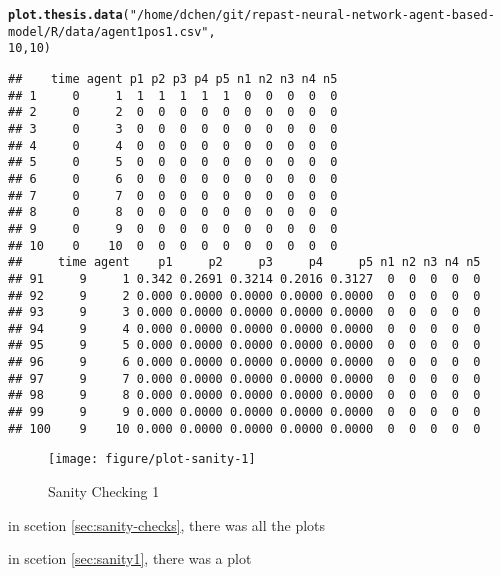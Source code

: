 \documentclass{article}\usepackage[]{graphicx}\usepackage[]{color}
\makeatletter
\def\maxwidth{ %
  \ifdim\Gin@nat@width>\linewidth
    \linewidth
  \else
    \Gin@nat@width
  \fi
}
\newcommand{\hlnum}[1]{\textcolor[rgb]{0.686,0.059,0.569}{#1}}%
\newcommand{\hlstr}[1]{\textcolor[rgb]{0.192,0.494,0.8}{#1}}%
\newcommand{\hlstd}[1]{\textcolor[rgb]{0.345,0.345,0.345}{#1}}%
\newcommand{\hlkwd}[1]{\textcolor[rgb]{0.737,0.353,0.396}{\textbf{#1}}}%
\newenvironment{kframe}{%
 \def\at@end@of@kframe{}%
 \ifinner\ifhmode%
  \def\at@end@of@kframe{\end{minipage}}%
  \begin{minipage}{\columnwidth}%
 \fi\fi%
 \def\FrameCommand##1{\hskip\@totalleftmargin \hskip-\fboxsep
 \colorbox{shadecolor}{##1}\hskip-\fboxsep
     \hskip-\linewidth \hskip-\@totalleftmargin \hskip\columnwidth}%
 \MakeFramed {\advance\hsize-\width
   \@totalleftmargin\z@ \linewidth\hsize
   \@setminipage}}%
 {\par\unskip\endMakeFramed%
 \at@end@of@kframe}
\newenvironment{knitrout}{}{} %
\makeatother
\begin{document}
\begin{knitrout}
\color{fgcolor}\begin{kframe}
\begin{alltt}
\hlkwd{plot.thesis.data}\hlstd{(}\hlstr{"/home/dchen/git/repast-neural-network-agent-based-model/R/data/agent1pos1.csv"}\hlstd{,}
    \hlnum{10}\hlstd{,} \hlnum{10}\hlstd{)}
\end{alltt}
\begin{verbatim}
##    time agent p1 p2 p3 p4 p5 n1 n2 n3 n4 n5
## 1     0     1  1  1  1  1  1  0  0  0  0  0
## 2     0     2  0  0  0  0  0  0  0  0  0  0
## 3     0     3  0  0  0  0  0  0  0  0  0  0
## 4     0     4  0  0  0  0  0  0  0  0  0  0
## 5     0     5  0  0  0  0  0  0  0  0  0  0
## 6     0     6  0  0  0  0  0  0  0  0  0  0
## 7     0     7  0  0  0  0  0  0  0  0  0  0
## 8     0     8  0  0  0  0  0  0  0  0  0  0
## 9     0     9  0  0  0  0  0  0  0  0  0  0
## 10    0    10  0  0  0  0  0  0  0  0  0  0
##     time agent    p1     p2     p3     p4     p5 n1 n2 n3 n4 n5
## 91     9     1 0.342 0.2691 0.3214 0.2016 0.3127  0  0  0  0  0
## 92     9     2 0.000 0.0000 0.0000 0.0000 0.0000  0  0  0  0  0
## 93     9     3 0.000 0.0000 0.0000 0.0000 0.0000  0  0  0  0  0
## 94     9     4 0.000 0.0000 0.0000 0.0000 0.0000  0  0  0  0  0
## 95     9     5 0.000 0.0000 0.0000 0.0000 0.0000  0  0  0  0  0
## 96     9     6 0.000 0.0000 0.0000 0.0000 0.0000  0  0  0  0  0
## 97     9     7 0.000 0.0000 0.0000 0.0000 0.0000  0  0  0  0  0
## 98     9     8 0.000 0.0000 0.0000 0.0000 0.0000  0  0  0  0  0
## 99     9     9 0.000 0.0000 0.0000 0.0000 0.0000  0  0  0  0  0
## 100    9    10 0.000 0.0000 0.0000 0.0000 0.0000  0  0  0  0  0
\end{verbatim}
\end{kframe}\begin{figure}[]

\texttt{[image: figure/plot-sanity-1]} \caption[Sanity Checking 1]{Sanity Checking 1\label{fig:plot-sanity-1}}
\end{figure}


\end{knitrout}


in scetion \ref{sec:sanity-checks}, there was all the plots

in scetion \ref{sec:sanity1}, there was a plot

\newpage
\end{document}
